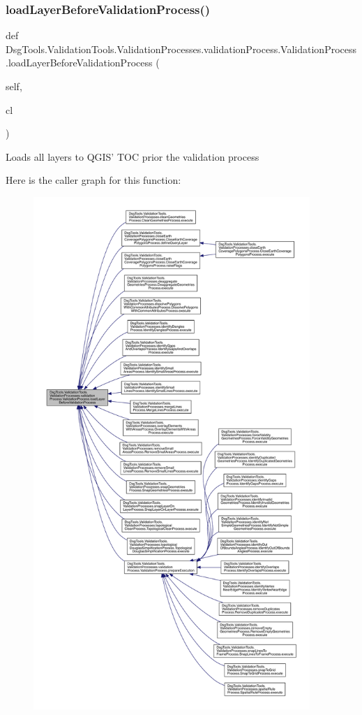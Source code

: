 \subsubsection{\texorpdfstring{load\+Layer\+Before\+Validation\+Process()}{loadLayerBeforeValidationProcess()}}
{\footnotesize\ttfamily def Dsg\+Tools.\+Validation\+Tools.\+Validation\+Processes.\+validation\+Process.\+Validation\+Process.\+load\+Layer\+Before\+Validation\+Process (\begin{DoxyParamCaption}\item[{}]{self,  }\item[{}]{cl }\end{DoxyParamCaption})}

\begin{DoxyVerb}Loads all layers to QGIS' TOC prior the validation process
\end{DoxyVerb}
 Here is the caller graph for this function\+:
\nopagebreak
\begin{figure}[H]
\begin{center}
\leavevmode
\includegraphics[height=550pt]{class_dsg_tools_1_1_validation_tools_1_1_validation_processes_1_1validation_process_1_1_validation_process_ae9f4d12aec5112802ab2bb77cceda153_icgraph}
\end{center}
\end{figure}
